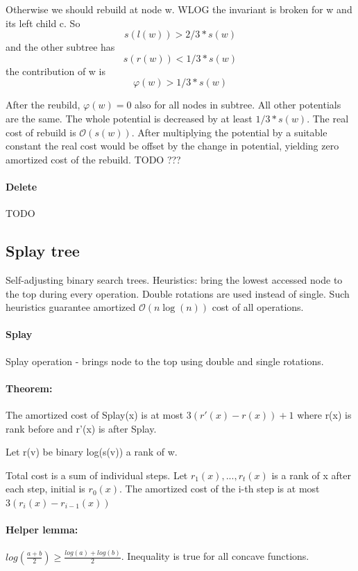 \documentclass[12pt]{article}
\newcommand{\bigO}{\mathcal{O}}
\begin{document}
Otherwise we should rebuild at node w. WLOG the invariant is broken for w and its left child c. So
\[ s(l(w)) > 2/3 * s(w) \]
and the other subtree has
\[ s(r(w)) < 1/3 * s(w) \]
the contribution of w is
\[ \varphi(w) > 1/3 * s(w) \]

After the reubild, $ \varphi(w) = 0 $ also for all nodes in subtree. All other potentials are the same.
The whole potential is decreased by at least $ 1/3 * s(w) $.
The real cost of rebuild is $ \bigO(s(w)) $. After multiplying the potential by a suitable constant the real cost would be offset by the change in potential, yielding zero amortized cost of the rebuild. TODO ???

\paragraph{Delete} TODO


\subsection{Splay tree}

Self-adjusting binary search trees. Heuristics: bring the lowest accessed node to the top during every operation. Double rotations are used instead of single.
Such heuristics guarantee amortized $\bigO(n\log(n))$ cost of all operations.

\paragraph{Splay}
Splay operation - brings node to the top using double and single rotations.

\paragraph{Theorem:} The amortized cost of Splay(x) is at most $ 3 (r'(x) - r(x)) + 1 $ where r(x) is rank before and r'(x) is after Splay.

Let r(v) be binary log(s(v)) a rank of w.

Total cost is a sum of individual steps. Let $ r_1(x), ..., r_t(x) $ is a rank of x after each step, initial is $ r_0(x) $.
The amortized cost of the i-th step is at most $ 3 (r_i(x) - r_{i-1}(x)) $

\paragraph{Helper lemma:}
$ log(\frac{a + b}{2}) \geq \frac{log(a) + log(b)}{2} $. Inequality is true for all concave functions.
\end{document}
